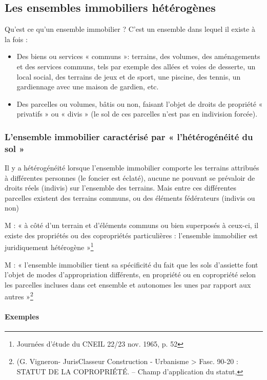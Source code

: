 	\subsection{Les ensembles immobiliers hétérogènes}
	
		Qu'est ce qu'un ensemble immobilier ? C'est un ensemble dans lequel il existe à la fois :
		\begin{itemize}
			\item Des biens ou services « communs »: terrains, des volumes, des aménagements et des services
			communs, tels par exemple des allées et voies de desserte, un local social, des terrains de jeux
			et de sport, une piscine, des tennis, un gardiennage avec une maison de gardien, etc.
			\item Des parcelles ou volumes, bâtis ou non, faisant l’objet de droits de propriété « privatifs » ou
			« divis » (le sol de ces parcelles n’est pas en indivision forcée).
		\end{itemize}
		
		\subsubsection{L’ensemble immobilier caractérisé par « l’hétérogénéité du sol »}
			Il y a hétérogénéité lorsque l'ensemble immobilier comporte les terrains attribués à différentes personnes
			(le foncier est éclaté), aucune ne pouvant se prévaloir de droits réels (indivis) sur l'ensemble des terrains.
			Mais entre ces différentes parcelles existent des terrains communs, ou des éléments fédérateurs (indivis
			ou non)
		
			M  : « à côté d'un terrain et d'éléments communs ou bien superposés à ceux-ci, il existe des propriétés ou des	copropriétés particulières : l'ensemble immobilier est juridiquement hétérogène »\footnote{
			Journées d'étude du CNEIL 22/23 nov. 1965, p. 52}
			
			M  : « l’ensemble immobilier tient sa spécificité du fait que les sols d’assiette font l’objet de modes d’appropriation différents, en propriété ou en copropriété selon les parcelles incluses dans cet ensemble et autonomes les unes par rapport aux autres »\footnote{
			(G. Vigneron- JurisClasseur Construction - Urbanisme > Fasc. 90-20 : STATUT DE LA COPROPRIÉTÉ. – Champ
			d'application du statut, }
			
			\paragraph{Exemples}
			
